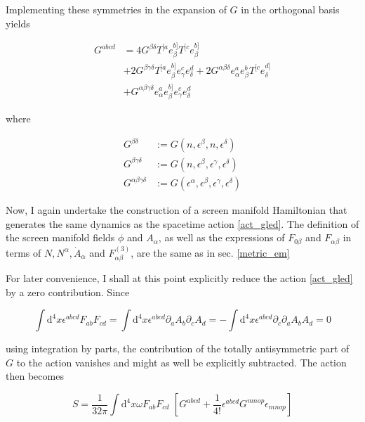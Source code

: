 \documentclass[11pt]{article}
\begin{document}
Implementing these symmetries in the expansion of $G$ in the orthogonal basis yields 

\begin{equation}
	\begin{split}
		G^{a b c d} 
		&= 4 G^{\beta \delta} T^{[a} e_\beta^{b]} T^{[c} e_\beta^{b]}\\
		&+ 2 G^{\beta \gamma \delta} T^{[a} e_\beta^{b]} e_\gamma^{c} e_\delta^{d}
		+ 2 G^{\alpha \beta \delta} e_\alpha^a e_\beta^{b} T^{[c} e_\delta^{d]}\\
		&+ G^{\alpha \beta \gamma \delta} e_\alpha^a e_\beta^{b]} e_\gamma^{c} e_\delta^{d}
	\end{split}   
\end{equation}

where

\begin{align}
	G^{\beta \delta} 
	&:= G \left( n, \epsilon^\beta, n, \epsilon^\delta \right)\\
	G^{\beta \gamma \delta} 
	&:= G \left( n, \epsilon^\beta, \epsilon^\gamma, \epsilon^\delta \right)\\
	G^{\alpha \beta \gamma \delta} 
	&:= G \left( \epsilon^\alpha, \epsilon^\beta, \epsilon^\gamma, \epsilon^\delta \right)
\end{align}

Now, I again undertake the construction of a screen manifold Hamiltonian that generates the same dynamics as the spacetime action \ref{act_gled}. The definition of the screen manifold fields $\phi$ and $A_\alpha$, as well as the expressions of $F_{ 0 \beta}$ and $F_{\alpha \beta}$ in terms of $N, N^\alpha, \dot{A}_\alpha$ and $F^{(3)}_{\alpha \beta}$, are the same as in sec. \ref{metric_em}

For later convenience, I shall at this point explicitly reduce the action \ref{act_gled} by a zero contribution. Since

\begin{equation}
	\int \mathrm{d}^4 x \epsilon^{a b c d} F_{a b} F_{c d} 
	= \int \mathrm{d}^4 x \epsilon^{a b c d} \partial_a A_b \partial_c A_d
	= - \int \mathrm{d}^4 x \epsilon^{a b c d} \partial_c \partial_a A_b A_d
	= 0
\end{equation}

using integration by parts, the contribution of the totally antisymmetric part of $G$ to the action vanishes and might as well be explicitly subtracted. The action then becomes

\begin{equation} 
	S = \frac{1}{32 \pi} \int \mathrm{d}^4 x \omega F_{a b} F_{c d} \, \,
	\left[ G^{a b c d} + \frac{1}{4!} \epsilon^{a b c d} G^{m n o p} \epsilon_{m n o p}
	\right]
\end{equation}
\end{document}
